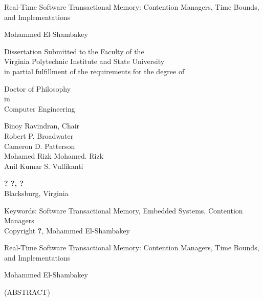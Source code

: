 \documentclass[12pt,english]{report}
\begin{document}
\thispagestyle{empty}
\begin{center}

{\Large 
Real-Time Software Transactional Memory: Contention Managers, Time Bounds, and Implementations
}

\vfill

Mohammed El-Shambakey

\vfill

Dissertation Submitted to the Faculty of the\\
Virginia Polytechnic Institute and State University\\
in partial fulfillment of the requirements for the degree of

\vfill

Doctor of Philosophy \\
in \\
Computer Engineering

\vfill

Binoy Ravindran, Chair \\
Robert P. Broadwater \\
Cameron D. Patterson \\
Mohamed Rizk Mohamed. Rizk\\
Anil Kumar S. Vullikanti

\vfill
\textbf{? ?, ?}\\
Blacksburg, Virginia

\vfill

Keywords: Software Transactional Memory, Embedded Systems, Contention Managers
\\
Copyright \textbf{?}, Mohammed El-Shambakey

\end{center}

\pagebreak

\thispagestyle{empty}
\begin{center}

{\large Real-Time Software Transactional Memory: Contention Managers, Time Bounds, and Implementations}

\vfill

Mohammed El-Shambakey

\vfill

(ABSTRACT)

\vfill

\end{center}



\end{document}
